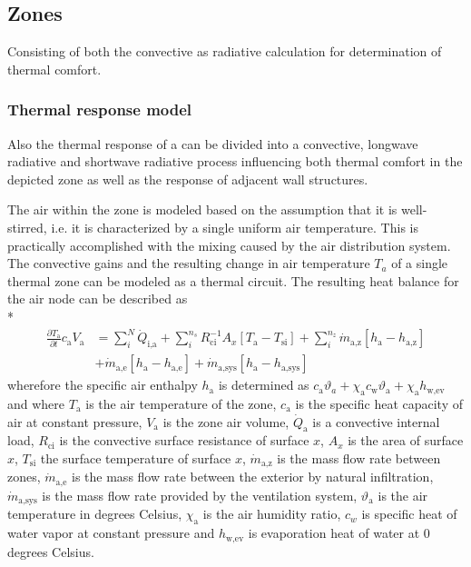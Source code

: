 \subsection{Zones}

Consisting of both the convective as radiative calculation for determination of thermal comfort.

\subsubsection{Thermal response model}

Also the thermal response of a  can be divided into a convective, longwave radiative and shortwave radiative process influencing both thermal comfort in the depicted zone as well as the response of adjacent wall structures.

The air within the zone is modeled based on the assumption that it is well-stirred, i.e. it is characterized by a single uniform air temperature. This is practically accomplished with the mixing caused by the air distribution system. The convective gains and the resulting change in air temperature $T_{a}$ of a single thermal zone can be modeled as a thermal circuit. The resulting heat balance for the air node can be described as \\*
\begin{equation}
\begin{split}
\frac{\partial T_{\textrm{a}}}{\partial t} c_{\textrm{a}} V_{\textrm{a}} & = \sum_{i}^{N} \dot{Q}_{\textrm{i,a}} + \sum_{i}^{n_{s}}R_{\textrm{ci}}^{-1}A_{x}\left[T_{\textrm{a}}-T_{\textrm{si}}\right] +\sum_{i}^{n_{z}}\dot{m}_{\textrm{a,z}}\left[h_{\textrm{a}}-h_{\textrm{a,z}}\right]  \\ & +\dot{m}_{\textrm{a,e}}\left[h_{\textrm{a}}-h_{\textrm{a,e}}\right] +\dot{m}_{\textrm{a,sys}}\left[h_{\textrm{a}}-h_{\textrm{a,sys}}\right]
\end{split}
\end{equation}
wherefore the specific air enthalpy $h_{\textrm{a}}$ is determined as $c_{\textrm{a}}\vartheta_{a}+\chi_{\textrm{a}} c_{\textrm{w}}\vartheta_{\textrm{a}} + \chi_{\textrm{a}} h_{\textrm{w,ev}}$ and where $T_{\textrm{a}}$ is the air temperature of the zone, $c_{\textrm{a}}$ is the specific heat capacity of air at constant pressure, $V_{\textrm{a}}$ is the zone air volume, $\dot{Q}_{\textrm{a}}$ is a convective internal load, $R_{\textrm{ci}}$ is the convective surface resistance of surface $x$, $A_{x}$ is the area of surface $x$, $T_{\textrm{si}}$ the surface temperature of surface $x$, $\dot{m}_{\textrm{a,z}}$ is the mass flow rate between zones, $\dot{m}_{\textrm{a,e}}$ is the mass flow rate between the exterior by natural infiltration, $\dot{m}_{\textrm{a,sys}}$ is the mass flow rate provided by the ventilation system, $\vartheta_{\textrm{a}}$ is the air temperature in degrees Celsius, $\chi_{\textrm{a}}$ is the air humidity ratio, $c_{w}$ is specific heat of water vapor at constant pressure and $h_{\textrm{w,ev}}$ is evaporation heat of water at 0 degrees Celsius. 

